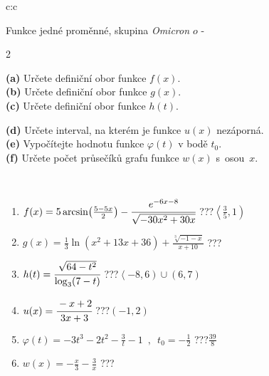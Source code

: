\documentclass[10pt]{report}
\newcommand\omicron{o}
\begin{document}
\begin{tabular}{c:c}
\begin{minipage}[c][104.5mm][t]{0.5\linewidth}
\begin{center}
{\huge Funkce jedné proměnné, skupina \textit{Omicron $\omicron$} -}\\[5mm]
\begin{minipage}{0.95\linewidth}
\begin{center}
{\small \begin{multicols}{2} \raggedright
\textbf{(a)} Určete definiční obor funkce \(f(x)\). \\[1mm]
\textbf{(b)} Určete definiční obor funkce \(g(x)\). \\[1mm]
\textbf{(c)} Určete definiční obor funkce \(h(t)\). \par \columnbreak
\textbf{(d)} Určete interval, na kterém je funkce \(u(x)\) nezáporná. \\[1mm]
\textbf{(e)} Vypočítejte hodnotu funkce \(\varphi(t)\) v bodě \(t_0\). \\[1mm]
\textbf{(f)} Určete počet průsečíků grafu funkce \(w(x)\) s~osou~\(x\). \\[1mm]
\end{multicols}
}
\end{center}
\end{minipage}
\\[4mm]
\begin{minipage}{0.79\linewidth}
\begin{center}
\begin{varwidth}{\linewidth}
\begin{enumerate}
\small
\item $f(x) = 5\arcsin\!\left( \frac{5-5x}{2} \right) - \cfrac{e^{-6x-8}}{\sqrt{-30x^2+30x}}$\quad \dotfill\; ???\;\dotfill \quad $\left\langle\frac{3}{5} , 1\right)$
\item $g(x) = \frac{1}{3} \ln{\!(x^2+13x+36)}+\frac{\sqrt[3]{-1-x}}{x+10}$\quad \dotfill\; ???\;\dotfill {}
\item $h(t) = \cfrac{\sqrt{64-t^2}}{\log_3(7-t)}$\quad \dotfill\; ???\;\dotfill \quad $\left\langle-8 , 6\right)\cup\left(6 , 7\right)$
\item $u(x) = \cfrac{-x+2}{3x+3}$\quad \dotfill\; ???\;\dotfill \quad $\left(-1 , 2\right)$
\item $\varphi(t) = -3t^3-2t^2-\frac{3}{t}-1 \enspace , \enspace t_0=-\frac{1}{2}$\quad \dotfill\; ???\;\dotfill \quad $\frac{39}{8}$
\item $w(x) = -\frac{x}{3}-\frac{3}{x}$\quad \dotfill\; ???\;\dotfill {}
\end{enumerate}

\end{varwidth}
\end{center}
\end{minipage}
\end{center}
\end{minipage}
\end{tabular}
\end{document}
